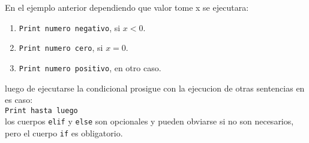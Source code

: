      En el ejemplo anterior dependiendo que valor tome x se ejecutara:
      
      \begin{enumerate}
         \item \texttt{Print \textquotedbl numero negativo\textquotedbl}, si $x < 0$.
         \item \texttt{Print \textquotedbl numero cero\textquotedbl    }, si $x = 0$.
         \item \texttt{Print \textquotedbl numero positivo\textquotedbl}, en otro caso.
      \end{enumerate}
      
      luego de ejecutarse la condicional prosigue con la ejecucion de otras sentencias en es caso:
      \\
      
      \texttt{Print \textquotedbl hasta luego\textquotedbl}
      \\
      
      los cuerpos \texttt{elif} y \texttt{else} son opcionales y pueden obviarse si no son necesarios, pero el cuerpo \texttt{if} es obligatorio.
      
      \begin{fxcode}
         \\
         \\
         \\
         \\
         \\
      \end{fxcode}
      
      \begin{fxcode}
         \\
         \\
         \\
         \\
         \\
         \\
      \end{fxcode}
      
